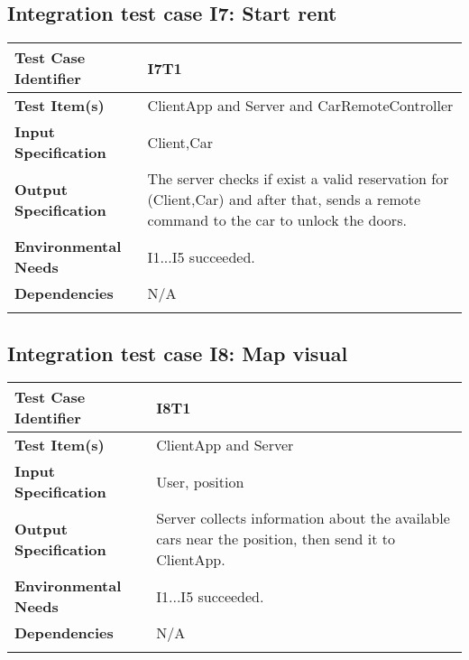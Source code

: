 \subsection{Integration test case I7: Start rent}

\begin{center}
\begin{tabular*}
{\textwidth}
{l p{10.5cm}}

\hline
\textbf{Test Case Identifier} & I7T1 \\
\hline
\textbf{Test Item(s)} & ClientApp and Server and CarRemoteController \\
\hline
\textbf{Input Specification} & Client,Car \\
\hline
\textbf{Output Specification} & The server checks if exist a valid reservation for (Client,Car) and after that, sends a remote command to the car to unlock the doors. \\
\hline
\textbf{Environmental Needs} &  I1...I5 succeeded. \\
\hline
\textbf{Dependencies} & N/A \\
\hline
\newline
\newline
\end{tabular*}
\end{center}




\subsection{Integration test case I8: Map visual}

\begin{center}
\begin{tabular*}
{\textwidth}
{l p{10.5cm}}

\hline
\textbf{Test Case Identifier} & I8T1 \\
\hline
\textbf{Test Item(s)} & ClientApp and Server \\
\hline
\textbf{Input Specification} & User, position \\
\hline
\textbf{Output Specification} & Server collects information about the available cars near the position, then send it to ClientApp.  \\
\hline
\textbf{Environmental Needs} &I1...I5 succeeded. \\
\hline
\textbf{Dependencies} & N/A\\
\hline
\newline
\newline
\end{tabular*}
\end{center}

